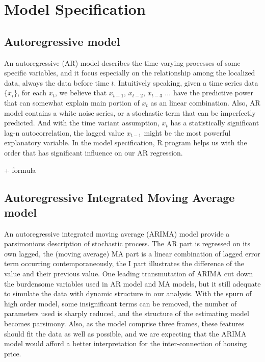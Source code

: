 \documentclass[12pt,letterpaper]{article}
\begin{document}
\section{Model Specification}
\subsection{Autoregressive model}
An autoregressive (AR) model describes the time-varying processes of some specific variables, and it focus especially on the relationship among the localized data, always the data before time $t$. 
Intuitively speaking, given a time series data $ \{x_i\}$, for each $x_t$, we believe that $x_{t-1}$, $x_{t-2}$, $x_{t-3}$ $\dots$ have the predictive power that can somewhat explain main portion of $x_t$ as an linear combination.
Also, AR model contains a white noise series, or a stochastic term that can be imperfectly predicted.
And with the time variant assumption, $x_t$ has a statistically significant lag-n autocorrelation, the lagged value $x_{t-1}$ might be the most powerful explanatory variable.
In the model specification, R program helps us with the order that has significant influence on our AR regression.

+ formula 

\subsection{Autoregressive Integrated Moving Average model}
An autoregressive integrated moving average (ARIMA) model provide a parsimonious description of stochastic process. 
The AR part is regressed on its own lagged, the (moving average) MA part is a linear combination of lagged error term occurring contemporaneously, the I part illustrates the difference of the value and their previous value. 
One leading transmutation of ARIMA cut down the burdensome variables used in AR model and MA models, but it still adequate to simulate the data with dynamic structure in our analysis.
With the spurn of high order model, some insignificant terms can be removed, the number of parameters used is sharply reduced, and the structure of the estimating model becomes parsimony.
Also, as the model comprise three frames, these features should fit the data as well as possible, and we are expecting that the ARIMA model would afford a better interpretation for the inter-connection of housing price.
\end{document}
